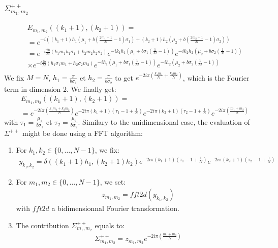 \subsubsection{$\Sigma_{m_1,m_2}^{++}$}
\begin{align*}
&E_{m_1,m_2}((k_1+1),(k_2+1))=\\
&=e^{-i\left((k_1+1)h_1\left(\mu_1+b\left(\frac{2m_1+1}{M}-1\right)\sigma_1\right)+(k_2+1)h_2\left(\mu_2+b\left(\frac{2m_2+1}{M}-1\right)\sigma_2\right)\right)}\\
&=e^{-i\frac{2b}{M}\left(k_1m_1h_1\sigma_1+k_2m_2h_2\sigma_2\right)}e^{-ik_1h_1\left(\mu_1+b\sigma_1\left(\frac{1}{M}-1\right)\right)}e^{-ik_2h_2\left(\mu_2+b\sigma_2\left(\frac{1}{M}-1\right)\right)}\\
&\times e^{-i\frac{2b}{M}\left(h_1\sigma_1 m_1+h_2\sigma_2 m_2\right)}e^{-ih_1\left(\mu_1+b\sigma_1\left(\frac{1}{M}-1\right)\right)}e^{-ih_2\left(\mu_2+b\sigma_2\left(\frac{1}{M}-1\right)\right)}\\
\end{align*}
We fix $M=N$, $h_1=\frac{\pi}{b\sigma_1}$ et $h_2=\frac{\pi}{b\sigma_2}$ to get $e^{-2i\pi\left(\frac{k_1m_1}{N}+\frac{k_2m_2}{N}\right)}$, which is the Fourier term in dimension 2. We finally get:
\begin{align*}
&E_{m_1,m_2}((k_1+1),(k_2+1))=\\
&=e^{-2i\pi\left(\frac{k_1m_1+k_2m_2}{N}\right)}e^{-2i\pi (k_1+1)\left(\tau_1-1+\frac{1}{N}\right)}e^{-2i\pi (k_2+1)\left(\tau_2-1+\frac{1}{N}\right)}e^{-2i\pi\left(\frac{m_1+m_2}{N}\right)}
\end{align*}
with $\tau_1=\frac{\mu_1}{b\sigma_1}$ et $\tau_2=\frac{\mu_2}{b\sigma_2}$.
Similary to the unidimensional case, the evaluation of $\Sigma^{++}$ might be done using a FFT algorithm:
\begin{enumerate}
\item For $k_1,k_2\in\{0,\hdots,N-1\}$, we fix:
\begin{align*}
y_{k_1,k_2}=\delta((k_1+1)h_1,(k_2+1)h_2)e^{-2i\pi (k_1+1)\left(\tau_1-1+\frac{1}{N}\right)}e^{-2i\pi (k_2+1)\left(\tau_2-1+\frac{1}{N}\right)}
\end{align*}
\item For $m_1,m_2\in\{0,\hdots,N-1\}$, we set:
\begin{align*}
  z_{m_1,m_2}=fft2d(y_{k_1,k_2})
\end{align*}
with $fft2d$ a bidimensionnal Fourier transformation.
\item The contribution $\Sigma_{m_1,m_2}^{++}$ equals to:
\begin{align*}
  \Sigma_{m_1,m_2}^{++}=z_{m_1,m_2}e^{-2i\pi\left(\frac{m_1+m_2}{N}\right)}
\end{align*}
\end{enumerate}

